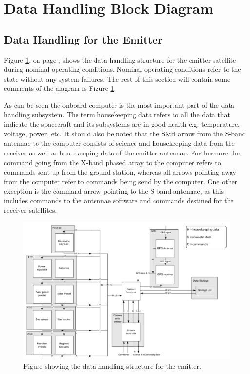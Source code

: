\section{Data Handling Block Diagram}
\label{DHBD}

\subsection{Data Handling for the Emitter}
\label{DataHandlingEmitter}

Figure \ref{fig:DHE}, on page \pageref{fig:DHE}, shows the data handling structure for the emitter satellite during nominal operating conditions. Nominal operating conditions refer to the state without any system failures. The rest of this section will contain some comments of the diagram is Figure \ref{fig:DHE}.

As can be seen the onboard computer is the most important part of the data handling subsystem. The term housekeeping data refers to all the data that indicate the spacecraft and its subsystems are in good health e.g. temperature, voltage, power, etc. It should also be noted that the S\&H arrow from the S-band antennae to the computer consists of science and housekeeping data from the receiver as well as  housekeeping data of the emitter antennae. Furthermore the command going from the X-band phased array to the computer refers to commands sent up from the ground station, whereas all arrows pointing away from the computer refer to commands being send by the computer. One other exception is the command arrow pointing to the S-band antennae, as this includes commands to the antennae software and commands destined for the receiver satellites.

\begin{figure}
\centering
\includegraphics[width=1.0\textwidth, angle=90]{chapters/img/DHReceiver.png}
\caption{Figure showing the data handling structure for the emitter.}
\label{fig:DHE}
\end{figure}


